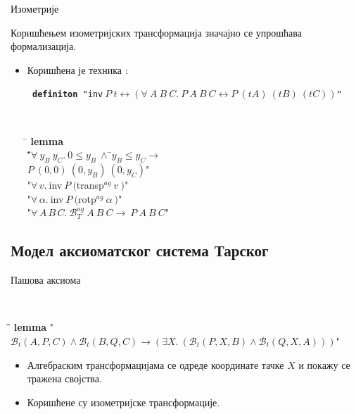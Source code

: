 \documentclass[slidestop, compress, mathserif, containsverbatim, xcolor=dvipsnames]{beamer}
\newcommand{\agbett}[3]{\ensuremath{\mathcal{B}_T^{\mathit{ag}}\ #1\ #2\ #3}}
\newcommand{\ag}[2]{\ensuremath{^{ag}\ #1\ #2}}
\newcommand{\bett}[3]{\ensuremath{\mathcal{B}_t(#1, #2, #3)}}
\begin{document}
\begin{frame}{Изометрије}
  \begin{block}{}
    Коришћењем изометријских трансформација значајно се упрошћава
    формализација.
  \end{block}
  \begin{itemize}
  \item Коришћена је техника :
    
    {\tt
      {\bf definiton} "inv$\ P\ t \longleftrightarrow (\forall\ A\ B\ C.\ P\ A\ B\ C
      \longleftrightarrow P\ (t A)\ (t B)\ (t C))$"\ 
    }


    {\tt
      \begin{tabbing}
        \hspace{5mm}\=\kill
               {\bf lemma}\\
                \="$\forall\ y_B\ y_C.\ 0 \le y_B \ \wedge\ $\=$y_B \le y_C \longrightarrow$ \\
               \>\>                                                        \>$P\ (0, 0)\ (0, y_B)\ (0, y_C)$"\\
               \>\>       "$\forall\,v.\ $inv$\ P\ ($transp$\ag{v}{})$" \\
               \>\>       "$\forall\,\alpha.\ $inv$\ P\ ($rotp$\ag{\alpha}{})$"\\
               \>{\bf shows}\>"$\forall\,A\,B\,C.\ \agbett{A}{B}{C} \longrightarrow\ P\ A\ B\ C$"
      \end{tabbing}
    } 
  \end{itemize}
\end{frame}

\subsection*{Модел аксиоматског система Тарског}

\begin{frame}[shrink]{Пашова аксиома}

  {\tt
    \begin{tabbing}
      \hspace{5mm}\=\hspace{5mm}\=\hspace{5mm}\=\hspace{5mm}\=\kill
      {\bf lemma} "$\bett{A}{P}{C} \wedge \bett{B}{Q}{C} \longrightarrow (\exists X.\ (\bett{P}{X}{B} \wedge \bett{Q}{X}{A}))$"
    \end{tabbing}
  }
  \begin{center}
    
  \end{center}

  \begin{itemize}
  \item Алгебраским трансформацијама се одреде координате тачке $X$ и
    покажу се тражена својства.
  \item Коришћене су изометријске трансформације.
  \end{itemize}
\end{frame}
\end{document}
